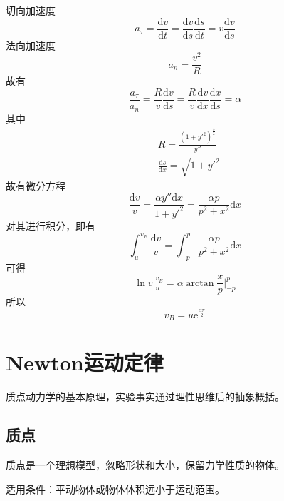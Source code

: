 \begin{solution}
切向加速度
\begin{equation*}
	a_\tau = \frac{\mathrm{d} v}{\mathrm{d} t} = \frac{\mathrm{d} v}{\mathrm{d} s} \frac{\mathrm{d} s}{\mathrm{d} t} = v\frac{\mathrm{d} v}{\mathrm{d} s}
\end{equation*}
法向加速度
\begin{equation*}
	a_n = \frac{v^2}{R}
\end{equation*}
故有
\begin{equation*}
	\frac{a_\tau}{a_n} = \frac{R}{v} \frac{\mathrm{d} v}{\mathrm{d} s} = \frac{R}{v} \frac{\mathrm{d} v}{\mathrm{d} x} \frac{\mathrm{d} x}{\mathrm{d} s} = \alpha
\end{equation*}
其中
\begin{align*}
	& R = \frac{(1+y'^2)^{\frac32}}{y''} \\
	& \frac{\mathrm{d} s}{\mathrm{d} x} = \sqrt{1+y'^2}
\end{align*}
故有微分方程
\begin{equation*}
	\frac{\mathrm{d} v}{v} = \frac{\alpha y'' \mathrm{d}x}{1+y'^2} = \frac{\alpha p}{p^2+x^2} \mathrm{d}x
\end{equation*}
对其进行积分，即有
\begin{equation*}
	\int_u^{v_B} \frac{\mathrm{d} v}{v} = \int_{-p}^p \frac{\alpha p}{p^2+x^2} \mathrm{d} x
\end{equation*}
可得
\begin{equation*}
	\ln v \bigg|_u^{v_B} = \alpha \arctan \frac{x}{p} \bigg|_{-p}^p
\end{equation*}
所以
\begin{equation*}
	v_B = u \mathrm{e}^{\frac{\alpha\pi}{2}}
\end{equation*}
\end{solution}

\section{Newton运动定律}

质点动力学的基本原理，实验事实通过理性思维后的抽象概括。

\subsection{质点}

{\heiti 质点}是一个理想模型，忽略形状和大小，保留力学性质的物体。

适用条件：平动物体或物体体积远小于运动范围。

